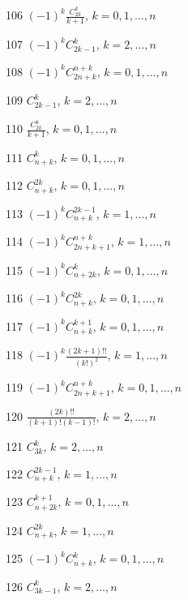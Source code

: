\documentclass[11pt, russian]{article}
\begin{document}
106 
$(-1)^{k}\frac{C_{2k}^k}{k+1}$, $k=0,1,\ldots,n$\par

107 
$(-1)^{k}C_{2k-1}^{k}$, $k=2,\ldots,n$\par

108 
$(-1)^{k}C_{2n+k}^{n+k}$, $k=0,1,\ldots,n$\par

109 
$C_{2k-1}^{k}$, $k=2,\ldots,n$\par

110 
$\frac{C_{2k}^k}{k+1}$, $k=0,1,\ldots,n$\par

111 
$C_{n+k}^{k}$, $k=0,1,\ldots,n$\par

112 
$C_{n+k}^{2k}$, $k=0,1,\ldots,n$\par

113 
$(-1)^{k}C_{n+k}^{2k-1}$, $k=1,\ldots,n$\par

114 
$(-1)^{k}C_{2n+k+1}^{n+k}$, $k=1,\ldots,n$\par

115 
$(-1)^{k}C_{n+2k}^{k}$, $k=0,1,\ldots,n$\par

116 
$(-1)^{k}C_{n+k}^{2k}$, $k=0,1,\ldots,n$\par

117 
$(-1)^{k}C_{n+k}^{k+1}$, $k=0,1,\ldots,n$\par

118 
$(-1)^{k}\frac{(2k+1)!!}{(k!)^2}$, $k=1,\ldots,n$\par

119 
$(-1)^{k}C_{2n+k+1}^{n+k}$, $k=0,1,\ldots,n$\par

120 
$\frac{(2k)!!}{(k+1)!(k-1)!}$, $k=2,\ldots,n$\par

121 
$C_{3k}^{k}$, $k=2,\ldots,n$\par

122 
$C_{n+k}^{2k-1}$, $k=1,\ldots,n$\par

123 
$C_{n+2k}^{k+1}$, $k=0,1,\ldots,n$\par

124 
$C_{n+k}^{2k}$, $k=1,\ldots,n$\par

125 
$(-1)^{k}C_{n+k}^{k}$, $k=0,1,\ldots,n$\par

126 
$C_{3k-1}^{k}$, $k=2,\ldots,n$\par
\end{document}
